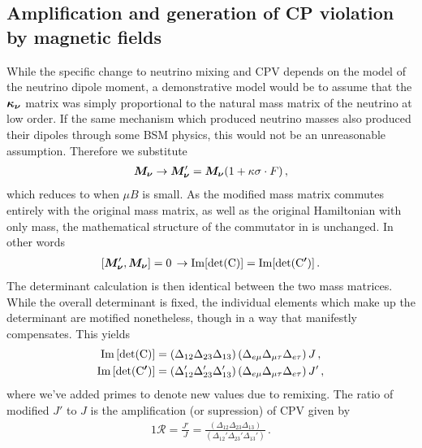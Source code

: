 \subsection{Amplification and generation of CP violation by magnetic fields}\label{sec:amp}
\noindent While the specific change to neutrino mixing and CPV depends on the model of the neutrino dipole moment, a demonstrative model would be to assume that the $\boldsymbol{\kappa_{\nu}}$ matrix was simply proportional to the natural mass matrix of the neutrino at low order. If the same mechanism which produced neutrino masses also produced their dipoles through some BSM physics, this would not be an unreasonable assumption. Therefore we substitute
\begin{alignat}{1}
	\label{simplek:1} \boldsymbol{M_{\nu}}\rightarrow\boldsymbol{M_{\nu}}'=\boldsymbol{M_{\nu}}(1+\kappa\sigma\cdot F)\,,
\end{alignat}
which reduces to  when $\mu B$ is small. As the modified mass matrix commutes entirely with the original mass matrix, as well as the original Hamiltonian with only mass, the mathematical structure of the commutator in  is unchanged. In other words
\begin{alignat}{1}
	\label{commutes:1} \left[\boldsymbol{M_{\nu}}',\boldsymbol{M_{\nu}}\right]=0\, \rightarrow \rm{Im}[\rm{det}(\boldsymbol{C})] = \rm{Im}[\rm{det}(\boldsymbol{C'})]\,.
\end{alignat}
The determinant calculation is then identical between the two mass matrices. While the overall determinant is fixed, the individual elements which make up the determinant are motified nonetheless, though in a way that manifestly compensates. This yields
\begin{alignat}{1}
	\label{det:0} \rm{Im}\left[\rm{det}(\boldsymbol{C})\right] &= \left(\Delta_{12}\Delta_{23}\Delta_{13}\right)\left(\Delta_{e\mu}\Delta_{\mu\tau}\Delta_{e\tau}\right)J\,,\\
	\label{det:2} \rm{Im}\left[\rm{det}(\boldsymbol{C'})\right] &= \left(\Delta_{12}'\Delta_{23}'\Delta_{13}'\right)\left(\Delta_{e\mu}\Delta_{\mu\tau}\Delta_{e\tau}\right)J'\,,
\end{alignat}
where we've added primes to denote new values due to remixing. The ratio of modified $J'$ to $J$ is the amplification (or supression) of CPV \ar given by
\begin{alignat}{1}
	\label{amp:1} \mathcal{R} = \frac{J'}{J} = \frac{\left(\Delta_{12}\Delta_{23}\Delta_{13}\right)}{\left(\Delta_{12}'\Delta_{23}'\Delta_{13}'\right)}\,.
\end{alignat}
